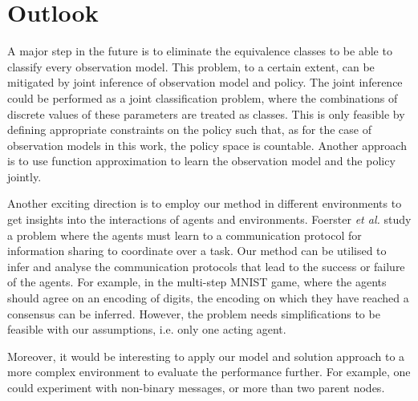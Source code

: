 \section{Outlook}
\label{chap:6}
A major step in the future is to eliminate the equivalence classes to be able to classify every observation model. This problem, to a certain extent, can be mitigated by joint inference of observation model and policy. The joint inference could be performed as a joint classification problem, where the combinations of discrete values of these parameters are treated as classes. This is only feasible by defining appropriate constraints on the policy such that, as for the case of observation models in this work, the policy space is countable. Another approach is to use function approximation to learn the observation model and the policy jointly.\par 
Another exciting direction is to employ our method in different environments to get insights into the interactions of agents and environments. 
Foerster \textit{et al.} \cite{Foerster2016} study a problem where the agents must learn to a communication protocol for information sharing to coordinate over a task. Our method can be utilised to infer and analyse the communication protocols that lead to the success or failure of the agents. For example, in the multi-step MNIST game, where the agents should agree on an encoding of digits, the encoding on which they have reached a consensus can be inferred. However, the problem needs simplifications to be feasible with our assumptions, i.e. only one acting agent. \par
Moreover, it would be interesting to apply our model and solution approach to a more complex environment to evaluate the performance further. For example, one could experiment with non-binary messages, or more than two parent nodes.\par

